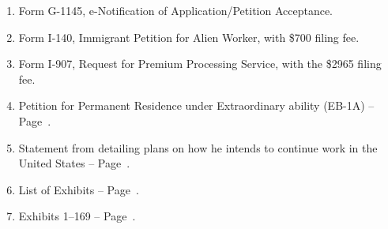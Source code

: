 
\begin{enumerate}[nosep]
    \item Form G-1145, e-Notification of Application/Petition Acceptance.
    \item Form I-140, Immigrant Petition for Alien Worker, with \$700 filing fee.
    \item Form I-907, Request for Premium Processing Service, with the \$2965 filing fee.
    \item Petition for Permanent Residence under Extraordinary ability (EB-1A) -- Page~\pageref{Body}.
    \item Statement from \mrl detailing plans on how he intends to continue work in the United States -- Page~\pageref{WorkPlan}.
    \item List of Exhibits -- Page~\pageref{ListOfExhibits}.
    \item Exhibits 1--169 -- Page~\pageref{Exhibits}. %
\end{enumerate}

\pagebreak
